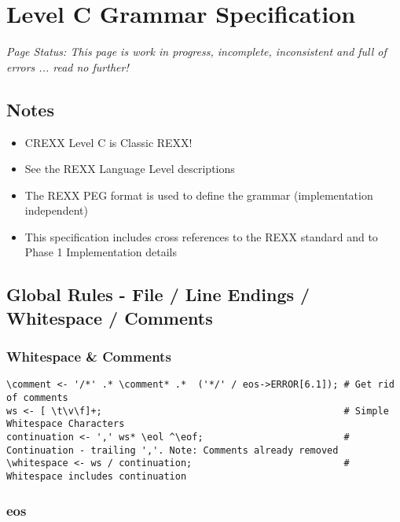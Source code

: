 \section{Level C Grammar Specification}

\emph{Page Status: This page is work in progress, incomplete, inconsistent and full of errors ... read no further!}

\subsection{Notes}

\begin{itemize}
\item CREXX Level C is Classic REXX!

\item See {the REXX Language Level} descriptions

\item The {REXX PEG format} is used to define the grammar (implementation independent)

\item This specification includes cross references to the REXX standard and to Phase 1 Implementation details

\end{itemize}

\subsection{Global Rules - File / Line Endings / Whitespace / Comments}

\subsubsection{Whitespace \& Comments}

\begin{verbatim}
\comment <- '/*' .* \comment* .*  ('*/' / eos->ERROR[6.1]); # Get rid of comments
ws <- [ \t\v\f]+;                                           # Simple Whitespace Characters
continuation <- ',' ws* \eol ^\eof;                         # Continuation - trailing ','. Note: Comments already removed
\whitespace <- ws / continuation;                           # Whitespace includes continuation
\end{verbatim}

\subsubsection{eos}

